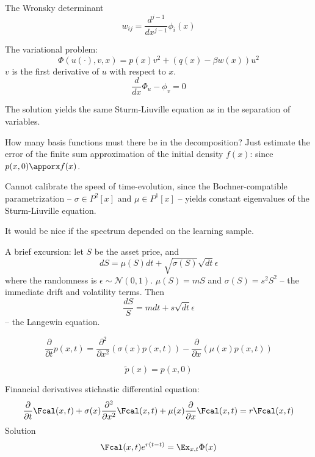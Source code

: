 \documentclass[a4paper]{article}
\newcommand{\clo}[1]{{\left [ #1 \right ]}}
\newcommand{\brac}[1]{{\left ( #1 \right )}}
\begin{document}
The Wronsky determinant \[w_{ij} = \frac{d^{j-1}}{dx^{j-1}} \phi_i(x)\]




The variational problem:
\[\Phi(u(\cdot), v, x) =  p(x) v^2 + \brac{ q(x) - \beta w(x) } u^2\]
$v$ is the first derivative of $u$ with respect to $x$.
\[\frac{d}{dx}\Phi_u - \phi_v = 0\]

The solution yields the same Sturm-Liuville equation as in the separation of variables.

How many basis functions must there be in the decomposition?
Just estimate the error of the finite sum approximation of the initial density $f(x)$: since $p(x,0) \apporx f(x)$.


Cannot calibrate the speed of time-evolution, since the Bochner-compatible parametrization -- $\sigma \in P^2\clo{x}$
and $\mu \in P^1\clo{x}$ -- yields constant eigenvalues of the Sturm-Liuville equation.

It would be nice if the spectrum depended on the learning sample.

A brief excursion:
let $S$ be the asset price, and \[dS = \mu(S) dt + \sqrt{\sigma(S)} \sqrt{dt} \epsilon\]
where the randomness is $\epsilon\sim \mathcal{N}(0,1)$.
$\mu(S) = m S$ and $\sigma(S) = s^2 S^2$ -- the immediate drift and volatility terms. Then
\[\frac{dS}{S} = m dt + s \sqrt{dt} \epsilon\]
-- the Langewin equation.

\[\frac{\partial}{\partial t} p(x,t) = \frac{\partial^2}{\partial x^2} \brac{\sigma(x) p(x,t)} - \frac{\partial}{\partial x} \brac{\mu(x) p(x,t)}\]

\[\tilde{p}(x) = p(x,0)\]

Financial derivatives stichastic differential equation:
\[\frac{\partial}{\partial t} \Fcal(x,t) + \sigma(x) \frac{\partial^2}{\partial x^2} \Fcal(x,t) + \mu(x) \frac{\partial}{\partial x} \Fcal(x,t) = r \Fcal(x,t)\]
Solution \[\Fcal(x,t) e^{r(t-t)} = \Ex_{x,t} \Phi(x)\]
\end{document}

